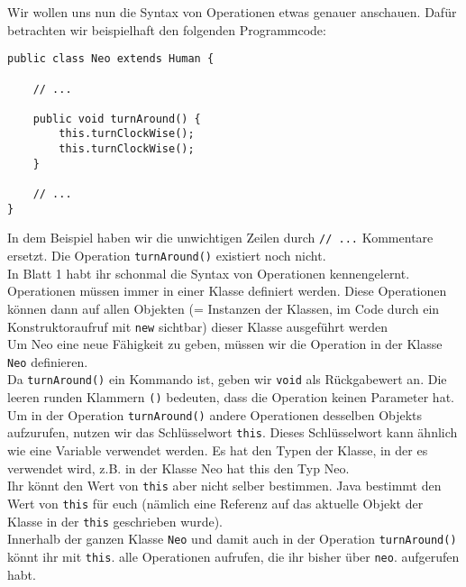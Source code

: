 \begin{Infobox}
    Wir wollen uns nun die Syntax von Operationen etwas genauer anschauen. 
    Dafür betrachten wir beispielhaft den folgenden Programmcode:

    \begin{lstlisting}[numbers=none]
public class Neo extends Human {

    // ...

    public void turnAround() {
        this.turnClockWise();
        this.turnClockWise();
    }

    // ...
}
    \end{lstlisting}

    In dem Beispiel haben wir die unwichtigen Zeilen durch \lstinline{// ...} Kommentare ersetzt.
Die Operation \lstinline{turnAround()} existiert noch nicht.\\

In Blatt 1 habt ihr schonmal die Syntax von Operationen kennengelernt.
Operationen müssen immer in einer Klasse definiert werden.
Diese Operationen können dann auf allen Objekten (= Instanzen
der Klassen, im Code durch ein Konstruktoraufruf mit \lstinline{new} sichtbar) dieser Klasse ausgeführt
werden\\

Um Neo eine neue Fähigkeit zu geben, müssen wir die Operation in der Klasse \lstinline{Neo} definieren.\\

Da \lstinline{turnAround()} ein Kommando ist, geben wir \lstinline{void} als Rückgabewert an.
Die leeren runden Klammern \lstinline{()} bedeuten, dass die Operation keinen Parameter hat.\\

Um in der Operation \lstinline{turnAround()} andere Operationen desselben Objekts aufzurufen, nutzen wir das Schlüsselwort \lstinline{this}.
Dieses Schlüsselwort kann ähnlich wie eine Variable verwendet werden. Es hat den Typen der Klasse, in der es verwendet wird, z.B. in der Klasse Neo hat this den Typ Neo.\\

Ihr könnt den Wert von \lstinline{this} aber nicht selber bestimmen.
Java bestimmt den Wert von \lstinline{this} für euch (nämlich eine Referenz auf das aktuelle Objekt der Klasse in der \lstinline{this} geschrieben wurde).\\

Innerhalb der ganzen Klasse \lstinline{Neo} und damit auch in der Operation \lstinline{turnAround()} könnt ihr mit \lstinline{this}. alle Operationen aufrufen, die ihr bisher über \lstinline{neo}. aufgerufen habt.

\end{Infobox}


